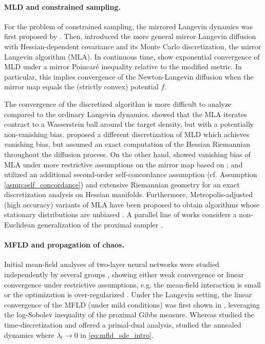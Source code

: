 \documentclass{article}
\begin{document}
\paragraph{MLD and constrained sampling.} For the problem of constrained sampling, the mirrored Langevin dynamics was first proposed by \citet{hsieh2018}. Then, \citet{zhang2020wasserstein} introduced the more general mirror Langevin diffusion with Hessian-dependent covariance and its Monte Carlo discretization, the mirror Langevin algorithm (MLA). In continuous time, \citet{chewi2020mld} show exponential convergence of MLD under a mirror Poincar\'{e} inequality relative to the modified metric. In particular, this implies convergence of the Newton-Langevin diffusion when the mirror map equals the (strictly convex) potential $f$.

The convergence of the discretized algorithm is more difficult to analyze compared to the ordinary Langevin dynamics. \citet{zhang2020wasserstein} showed that the MLA iterates contract to a Wasserstein ball around the target density, but with a potentially non-vanishing bias. \citet{ahn2021efficient} proposed a different discretization of MLD which achieves vanishing bias, but assumed an exact computation of the Hessian Riemannian throughout the diffusion process.
On the other hand, \citet{li2022mirror} showed vanishing bias of MLA under more restrictive assumptions on the mirror map based on \citet{li2019stochastic}; and \citet{gatmiry2022convergence} utilized an additional second-order self-concordance assumption (cf. Assumption \ref{asmp:self_concordance}) and extensive Riemannian geometry for an exact discretization analysis on Hessian manifolds. Furthermore, Metropolis-adjusted (high accuracy) variants of MLA have been proposed to obtain algorithms whose stationary distributions are unbiased \citep{srinivasan2024fast,srinivasan2024high}. A parallel line of works considers a non-Euclidean generalization of the proximal sampler \cite{gopi2023algorithmic,gu2026functional}.

\paragraph{MFLD and propagation of chaos.} Initial mean-field analyses of two-layer neural networks were studied independently by several groups \citep{mei2018meanfield,chizat2018global,sirignano2018mfnn,hu2021mfld}, showing either weak convergence or linear convergence under restrictive assumptions, e.g. the mean-field interaction is small or the optimization is over-regularized \citep{eberle2019quantitative}. Under the Langevin setting, the linear convergence of the MFLD (under mild conditions) was first shown in \citet{nitanda2022convex,chizat2022meanfield}, leveraging the log-Sobolev inequality of the proximal Gibbs measure. Whereas \citet{nitanda2022convex} studied the time-discretization and offered a primal-dual analysis, \citet{chizat2022meanfield} studied the annealed dynamics where $\lambda_t\to 0$ in \eqref{eq:mfld_sde_intro}. %
\end{document}
